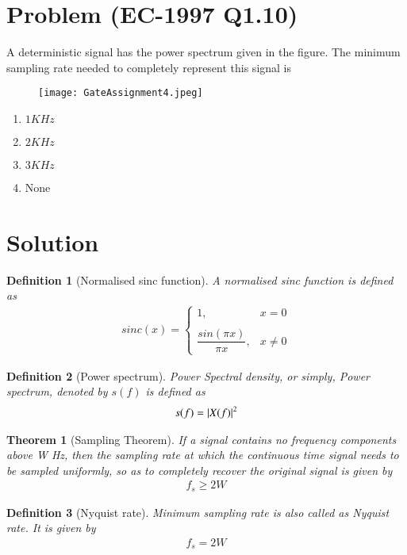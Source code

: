 \documentclass[journal,12pt,twocolumn]{IEEEtran}
\newtheorem{theorem}{Theorem}[section]
\newtheorem{definition}{Definition}[section]
\begin{document}
\section{Problem (EC-1997 Q1.10)}
A deterministic signal has the power spectrum given in the figure. The minimum sampling rate needed to completely represent this signal is
\begin{figure}[!h]
 \centering
 \texttt{[image: GateAssignment4.jpeg]}
 \label{plot}
\end{figure}
\begin{enumerate}
    \item $1 KHz$
    \item $2 KHz$
    \item $3 KHz$
    \item None
\end{enumerate}
\section{Solution}
\begin{definition}[Normalised sinc function]
A normalised sinc function is defined as
\begin{align}
    sinc(x)=\begin{cases}
	1, & x=0 \\~\\[-1em]
	\dfrac{sin(\pi x)}{\pi x}, & x\neq 0
	\end{cases}
	\label{eq:sinc}
\end{align}
\end{definition}
\begin{definition}[Power spectrum]
Power Spectral density, or simply, Power spectrum, denoted by $s(f)$ is defined as  \label{eq:def}
\begin{align}
    s(f)=\vert X(f)\vert^2
\end{align}
\end{definition}
\begin{theorem}[Sampling Theorem]
If a signal contains no frequency components above W Hz, then the sampling rate at which the continuous time signal needs to be sampled uniformly, so as to completely recover the original signal is given by\label{samp}
\begin{align}
    f_s\geq2W
    \label{eq:sthm}
\end{align}
\end{theorem}
\begin{definition}[Nyquist rate]
Minimum sampling rate is also called as Nyquist rate. It is given by
\begin{align}
    f_s=2W
    \label{eq:ns}
\end{align}
\end{definition}
\end{document}

